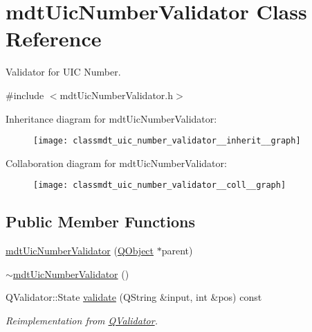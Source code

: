 \hypertarget{classmdt_uic_number_validator}{\section{mdt\-Uic\-Number\-Validator Class Reference}
\label{classmdt_uic_number_validator}
}


Validator for U\-I\-C Number.  




{\ttfamily \#include $<$mdt\-Uic\-Number\-Validator.\-h$>$}



Inheritance diagram for mdt\-Uic\-Number\-Validator\-:\nopagebreak
\begin{figure}[H]
\begin{center}
\leavevmode
\texttt{[image: classmdt\_uic\_number\_validator\_\_inherit\_\_graph]}
\end{center}
\end{figure}


Collaboration diagram for mdt\-Uic\-Number\-Validator\-:\nopagebreak
\begin{figure}[H]
\begin{center}
\leavevmode
\texttt{[image: classmdt\_uic\_number\_validator\_\_coll\_\_graph]}
\end{center}
\end{figure}
\subsection*{Public Member Functions}
\begin{DoxyCompactItemize}
\item 
\hyperlink{classmdt_uic_number_validator_afc666122b30492602463ef0ed0a9ace7}{mdt\-Uic\-Number\-Validator} (\hyperlink{class_q_object}{Q\-Object} $\ast$parent)
\item 
\hyperlink{classmdt_uic_number_validator_a5df03c59b859355deee5f83dd6a31d14}{$\sim$mdt\-Uic\-Number\-Validator} ()
\item 
Q\-Validator\-::\-State \hyperlink{classmdt_uic_number_validator_a974ac5a8918f4a2f949314d3bee07e40}{validate} (Q\-String \&input, int \&pos) const 
\begin{DoxyCompactList}\small\item\em Reimplementation from \hyperlink{class_q_validator}{Q\-Validator}. \end{DoxyCompactList}\end{DoxyCompactItemize}


